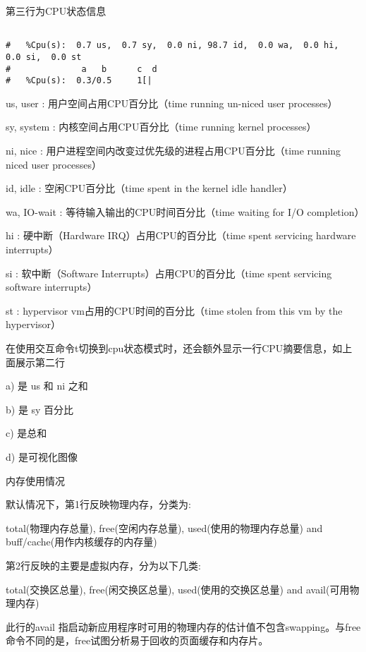 第三行为CPU状态信息


\begin{lstlisting}[language=cshell]

#   %Cpu(s):  0.7 us,  0.7 sy,  0.0 ni, 98.7 id,  0.0 wa,  0.0 hi,  0.0 si,  0.0 st
#              a   b      c  d 
#   %Cpu(s):  0.3/0.5     1[|

\end{lstlisting}

us, user    : 用户空间占用CPU百分比（time running un-niced user processes）    \par
sy, system  : 内核空间占用CPU百分比（time running kernel processes）  \par
ni, nice    : 用户进程空间内改变过优先级的进程占用CPU百分比（time running niced user processes）   \par
id, idle    : 空闲CPU百分比（time spent in the kernel idle handler）  \par
wa, IO-wait : 等待输入输出的CPU时间百分比（time waiting for I/O completion）       \par
hi : 硬中断（Hardware IRQ）占用CPU的百分比（time spent servicing hardware interrupts）      \par
si : 软中断（Software Interrupts）占用CPU的百分比（time spent servicing software interrupts）      \par
st : hypervisor vm占用的CPU时间的百分比（time stolen from this vm by the hypervisor） \par

在使用交互命令t切换到cpu状态模式时，还会额外显示一行CPU摘要信息，如上面展示第二行

a) 是 us 和 ni 之和 \par
b) 是 sy 百分比 \par
c) 是总和   \par
d) 是可视化图像 \par


内存使用情况

默认情况下，第1行反映物理内存，分类为:\par
total(物理内存总量), free(空闲内存总量), used(使用的物理内存总量) and buff/cache(用作内核缓存的内存量)

第2行反映的主要是虚拟内存，分为以下几类:\par
total(交换区总量), free(闲交换区总量), used(使用的交换区总量) and avail(可用物理内存)

此行的avail 指启动新应用程序时可用的物理内存的估计值不包含swapping。与free命令不同的是，free试图分析易于回收的页面缓存和内存片。

